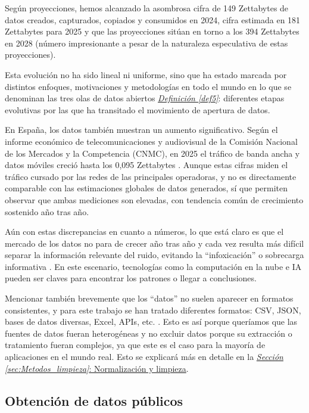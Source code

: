 Según proyecciones, hemos alcanzado la asombrosa cifra de 149 Zettabytes de datos creados, capturados, copiados y consumidos en 2024, cifra estimada en 181 Zettabytes para 2025 y que las proyecciones sitúan en torno a los 394 Zettabytes en 2028 \citep{BigDataStatista, BigDataStadisticsMarket} (número impresionante a pesar de la naturaleza especulativa de estas proyecciones).

Esta evolución no ha sido lineal ni uniforme, sino que ha estado marcada por distintos enfoques, motivaciones y metodologías en todo el mundo en lo que se denominan las tres olas de datos abiertos \hyperref[def5]{\textit{Definición \ref*{def5}}}: diferentes etapas evolutivas por las que ha transitado el movimiento de apertura de datos.

En España, los datos también muestran un aumento significativo. Según el informe económico de telecomunicaciones y audiovisual de la Comisión Nacional de los Mercados y la Competencia (CNMC), en 2025 el tráfico de banda ancha y datos móviles creció hasta los 0,095 Zettabytes \citep{CNMC2026Informe}. Aunque estas cifras miden el tráfico cursado por las redes de las principales operadoras, y no es directamente comparable con las estimaciones globales de datos generados, sí que permiten observar que ambas mediciones son elevadas, con tendencia común de crecimiento sostenido año tras año.

Aún con estas discrepancias en cuanto a números, lo que está claro es que el mercado de los datos no para de crecer año tras año y cada vez resulta más difícil separar la información relevante del ruido, evitando la ``infoxicación'' o sobrecarga informativa \citep{Infoxicacion}. En este escenario, tecnologías como la computación en la nube e IA pueden ser claves para encontrar los patrones o llegar a conclusiones.

Mencionar también brevemente que los ``datos'' no suelen aparecer en formatos consistentes, y para este trabajo se han tratado diferentes formatos: CSV, JSON, bases de datos diversas, Excel, APIs, etc. \citep{khan2019fileFormats}. Esto es así porque queríamos que las fuentes de datos fueran heterogéneas y no excluir datos porque su extracción o tratamiento fueran complejos, ya que este es el caso para la mayoría de aplicaciones en el mundo real. Esto se explicará más en detalle en la \hyperref[sec:Metodos_limpieza]{\textit{Sección \ref*{sec:Metodos_limpieza}}: Normalización y limpieza}.

\subsection{Obtención de datos públicos}

